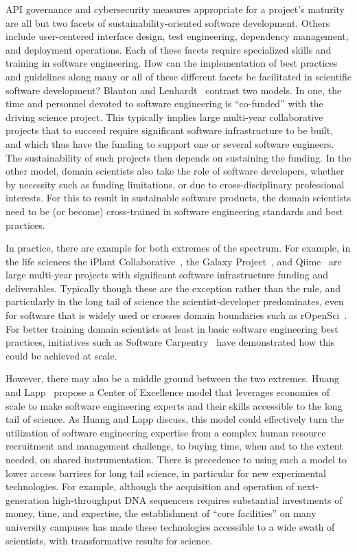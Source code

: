 \documentclass[11pt, oneside]{amsart}
\newcommand{\toolname}[1] {\textsf{#1}}
\begin{document}
API governance and cybersecurity measures appropriate for a project's
maturity are all but two facets of sustainability-oriented software
development. Others include user-centered interface design, test
engineering, dependency management, and deployment operations. Each of
these facets require specialized skills and training in software
engineering. How can the implementation of best practices and
guidelines along many or all of these different facets be facilitated
in scientific software development? Blanton and
Lenhardt~\cite{Blanton_WSSSPE} contrast two models. In one, the time
and personnel devoted to software engineering is ``co-funded'' with
the driving science project. This typically implies large multi-year
collaborative projects that to succeed require significant software
infrastructure to be built, and which thus have the funding to support
one or several software engineers. The sustainability of such projects
then depends on sustaining the funding. In the other model, domain
scientists also take the role of software developers, whether by
necessity such as funding limitations, or due to cross-disciplinary
professional interests. For this to result in sustainable software
products, the domain scientists need to be (or become) cross-trained
in software engineering standards and best practices.

In practice, there are example for both extremes of the spectrum. For
example, in the life sciences the iPlant Collaborative~\cite{iPlant},
the Galaxy Project~\cite{Galaxy}, and \toolname{Qiime}~\cite{Qiime} are large
multi-year projects with significant software infrastructure funding
and deliverables. Typically though these are the exception rather than
the rule, and particularly in the long tail of science the
scientist-developer predominates, even for software that is widely
used or crosses domain boundaries such as
\toolname{rOpenSci}~\cite{rOpenSci}. For better training domain scientists at
least in basic software engineering best practices, initiatives such
as Software Carpentry~\cite{SoftwareCarpentry} have demonstrated how
this could be achieved at scale.

However, there may also be a middle ground between the two
extremes. Huang and Lapp~\cite{Huang_WSSSPE} propose a Center of
Excellence model that leverages economies of scale to make software
engineering experts and their skills accessible to the long tail of
science. As Huang and Lapp discuss, this model could effectively turn
the utilization of software engineering expertise from a complex human
resource recruitment and management challenge, to buying time, when
and to the extent needed, on shared instrumentation. There is
precedence to using such a model to lower access barriers for long
tail science, in particular for new experimental technologies.  For
example, although the acquisition and operation of next-generation
high-throughput DNA sequencers requires substantial investments of
money, time, and expertise, the establishment of ``core facilities''
on many university campuses has made these technologies accessible to
a wide swath of scientists, with transformative results for science.
\end{document}
